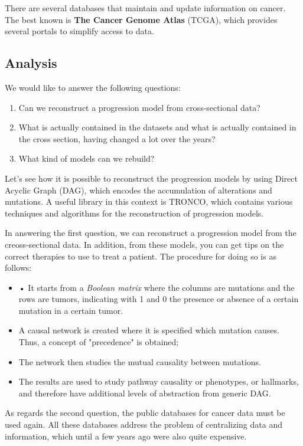 There are several databases that maintain and update information on cancer. The best known is
\textbf{The Cancer Genome Atlas} (TCGA), which provides several portals to simplify access to data.
\subsection{Analysis}
We would like to answer the following questions:
\begin{enumerate}
    \item Can we reconstruct a progression model from cross-sectional data?
    \item What is actually contained in the datasets and what is actually contained in the
          cross section, having changed a lot over the years?
    \item What kind of models can we rebuild?
\end{enumerate}

Let’s see how it is possible to reconstruct the progression models by using Direct
Acyclic Graph (DAG), which encodes the accumulation of alterations and mutations. A useful
library in this context is TRONCO, which contains various techniques and algorithms for the
reconstruction of progression models.

In answering the first question, we can reconstruct a progression model from the creoss-sectional
data. In addition, from these models, you can get tips on the correct therapies to use to treat
a patient. The procedure for doing so is as follows:
\begin{itemize}
    \item • It starts from a \textit{Boolean matrix} where the columns are mutations and the rows
          are tumors, indicating with 1 and 0 the presence or absence of a certain mutation in a certain tumor.
    \item A causal network is created where it is specified which mutation causes. Thus, a concept of
          "precedence" is obtained;
    \item The network then studies the mutual causality between mutations.
    \item The results are used to study pathway causality or phenotypes, or hallmarks, and therefore
          have additional levels of abstraction from generic DAG.
\end{itemize}

As regards the second question, the public databases for cancer data must be used again. All these
databases address the problem of centralizing data and information, which until a few years ago
were also quite expensive.

